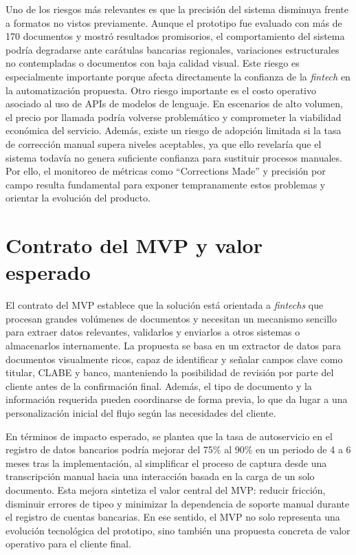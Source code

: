 Uno de los riesgos más relevantes es que la precisión del sistema disminuya frente a formatos no vistos previamente. Aunque el prototipo fue evaluado con más de 170 documentos y mostró resultados promisorios, el comportamiento del sistema podría degradarse ante carátulas bancarias regionales, variaciones estructurales no contempladas o documentos con baja calidad visual. Este riesgo es especialmente importante porque afecta directamente la confianza de la \textit{fintech} en la automatización propuesta. Otro riesgo importante es el costo operativo asociado al uso de APIs de modelos de lenguaje. En escenarios de alto volumen, el precio por llamada podría volverse problemático y comprometer la viabilidad económica del servicio. Además, existe un riesgo de adopción limitada si la tasa de corrección manual supera niveles aceptables, ya que ello revelaría que el sistema todavía no genera suficiente confianza para sustituir procesos manuales. Por ello, el monitoreo de métricas como ``Corrections Made'' y precisión por campo resulta fundamental para exponer tempranamente estos problemas y orientar la evolución del producto. 

\section{Contrato del MVP y valor esperado}

El contrato del MVP establece que la solución está orientada a \textit{fintechs} que procesan grandes volúmenes de documentos y necesitan un mecanismo sencillo para extraer datos relevantes, validarlos y enviarlos a otros sistemas o almacenarlos internamente. La propuesta se basa en un extractor de datos para documentos visualmente ricos, capaz de identificar y señalar campos clave como titular, CLABE y banco, manteniendo la posibilidad de revisión por parte del cliente antes de la confirmación final. Además, el tipo de documento y la información requerida pueden coordinarse de forma previa, lo que da lugar a una personalización inicial del flujo según las necesidades del cliente.

En términos de impacto esperado, se plantea que la tasa de autoservicio en el registro de datos bancarios podría mejorar del 75\% al 90\% en un periodo de 4 a 6 meses tras la implementación, al simplificar el proceso de captura desde una transcripción manual hacia una interacción basada en la carga de un solo documento. Esta mejora sintetiza el valor central del MVP: reducir fricción, disminuir errores de tipeo y minimizar la dependencia de soporte manual durante el registro de cuentas bancarias. En ese sentido, el MVP no solo representa una evolución tecnológica del prototipo, sino también una propuesta concreta de valor operativo para el cliente final.






